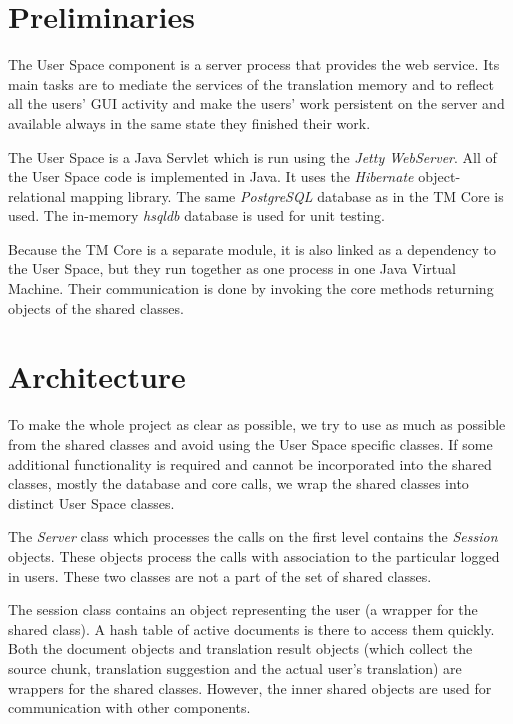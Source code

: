 \section{Preliminaries}

The User Space component is a server process that provides the web service. Its main tasks are to mediate the services of the translation memory and to reflect all the users' GUI activity and make the users' work persistent on the server and available always in the same state they finished their work.

The User Space is a Java Servlet which is run using the \emph{Jetty WebServer}. All of the User Space code is implemented in Java. It uses the \emph{Hibernate} object-relational mapping library. The same \emph{PostgreSQL} database as in the TM Core is used. The in-memory \emph{hsqldb} database is used for unit testing.

Because the TM Core is a separate module, it is also linked as a dependency to the User Space, but they run together as one process in one Java Virtual Machine. Their communication is done by invoking the core methods returning objects of the shared classes.

\section{Architecture}

To make the whole project as clear as possible, we try to use as much as possible from the shared classes and avoid using the User Space specific classes. If some additional functionality is required and cannot be incorporated into the shared classes, mostly the database and core calls, we wrap the shared classes into distinct User Space classes.

The \emph{Server} class which processes the calls on the first level contains the {\it Session} objects. These objects process the calls with association to the particular logged in users. These two classes are not a part of the set of shared classes.

The session class contains an object representing the user (a wrapper for the shared class). A hash table of active documents is there to access  them quickly. Both the document objects and translation result objects (which collect the source chunk, translation suggestion and the actual user's translation) are wrappers for the shared classes. However, the inner shared objects are used for communication with other components.

